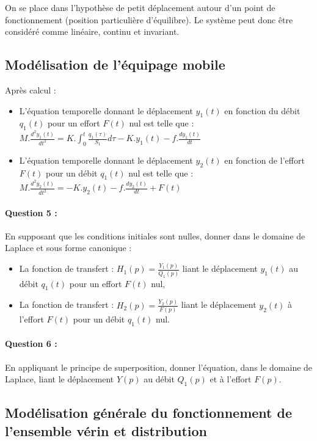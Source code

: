 On se place dans l'hypothèse de petit déplacement autour d'un point de fonctionnement (position particulière d'équilibre). Le système peut donc être considéré comme linéaire, continu et invariant.

\subsection{Modélisation de l'équipage mobile}

Après calcul :
\begin{itemize}
 \item L'équation temporelle donnant le déplacement $y_1(t)$ en fonction du débit $q_1(t)$ pour un effort $F(t)$ nul est telle que : 
 $M.\frac{d^2y_1(t)}{dt^2}=K.\int_{0}^{t} \frac{q_1(\tau)}{S_1}d\tau-K.y_1(t)-f.\frac{dy_1(t)}{dt}$
 \item L'équation temporelle donnant le déplacement $y_2(t)$ en fonction de l'effort $F(t)$ pour un débit $q_1(t)$ nul est telle que :
 $M.\frac{d^2y_2(t)}{dt^2}=-K.y_2(t)-f.\frac{dy_2(t)}{dt}+F(t)$
\end{itemize}

\paragraph{Question 5 :} En supposant que les conditions initiales sont nulles, donner dans le domaine de Laplace et sous forme canonique :

\begin{itemize}
 \item La fonction de transfert : $H_1(p)=\frac{Y_1(p)}{Q_1(p)}$ liant le déplacement $y_1(t)$ au débit $q_1(t)$ pour un effort $F(t)$ nul,
 \item La fonction de transfert : $H_2(p)=\frac{Y_2(p)}{F(p)}$ liant le déplacement $y_2(t)$ à l'effort $F(t)$ pour un débit $q_1(t)$ nul.
\end{itemize}
  
\paragraph{Question 6 :} En appliquant le principe de superposition, donner l'équation, dans le domaine de Laplace, liant le déplacement $Y(p)$ au débit $Q_1(p)$ et à l'effort $F(p)$.

\subsection{Modélisation générale du fonctionnement de l'ensemble vérin et distribution}

